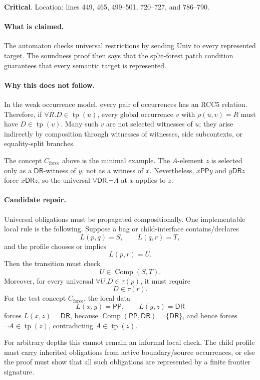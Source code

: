 \documentclass[11pt]{article}
\newcommand{\PP}{\mathsf{PP}}
\newcommand{\DR}{\mathsf{DR}}
\newcommand{\Comp}{\operatorname{Comp}}
\newcommand{\tp}{\operatorname{tp}}
\newcommand{\Critical}{\textbf{\textcolor{crit}{Critical}}}
\begin{document}
\noindent\Critical.  Location: lines 449, 465, 499--501, 720--727, and 786--790.

\paragraph{What is claimed.}
The automaton checks universal restrictions by sending \textsf{Univ} to every represented target.  The soundness proof then says that the split-forest patch condition guarantees that every semantic target is represented.

\paragraph{Why this does not follow.}
In the weak occurrence model, every pair of occurrences has an RCC5 relation.  Therefore, if $\forall R.D\in\tp(u)$, every global occurrence $v$ with $\rho(u,v)=R$ must have $D\in\tp(v)$.  Many such $v$ are not selected witnesses of $u$; they arise indirectly by composition through witnesses of witnesses, side subcontexts, or equality-split branches.

The concept $C_{\mathrm{force}}$ above is the minimal example.  The $A$-element $z$ is selected only as a $\DR$-witness of $y$, not as a witness of $x$.  Nevertheless, $x\PP y$ and $y\DR z$ force $x\DR z$, so the universal $\forall\DR.\neg A$ at $x$ applies to $z$.

\paragraph{Candidate repair.}
Universal obligations must be propagated compositionally.  One implementable local rule is the following.  Suppose a bag or child-interface contains/declares
\[
  L(p,q)=S, \qquad L(q,r)=T,
\]
and the profile chooses or implies
\[
  L(p,r)=U.
\]
Then the transition must check
\[
  U\in\Comp(S,T).
\]
Moreover, for every universal $\forall U.D\in\tau(p)$, it must require
\[
  D\in\tau(r).
\]
For the test concept $C_{\mathrm{force}}$, the local data
\[
  L(x,y)=\PP, \qquad L(y,z)=\DR
\]
forces $L(x,z)=\DR$, because $\Comp(\PP,\DR)=\{\DR\}$, and hence forces $\neg A\in\tp(z)$, contradicting $A\in\tp(z)$.

For arbitrary depths this cannot remain an informal local check.  The child profile must carry inherited obligations from active boundary/source occurrences, or else the proof must show that all such obligations are represented by a finite frontier signature.
\end{document}
